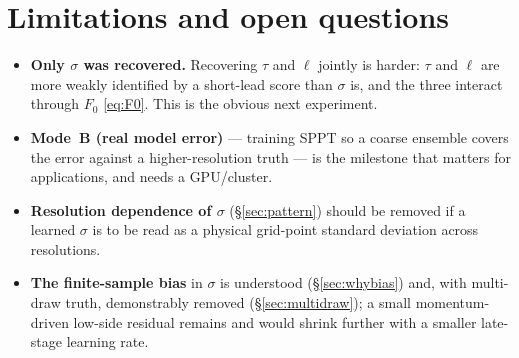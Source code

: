 \documentclass[11pt]{article}
\begin{document}
\section{Limitations and open questions}
\begin{itemize}
\item \textbf{Only $\sigma$ was recovered.} Recovering $\tau$ and $\ell$ jointly
  is harder: $\tau$ and $\ell$ are more weakly identified by a short-lead score
  than $\sigma$ is, and the three interact through $F_0$ \eqref{eq:F0}. This is
  the obvious next experiment.
\item \textbf{Mode~B (real model error)} --- training SPPT so a coarse ensemble
  covers the error against a higher-resolution truth --- is the milestone that
  matters for applications, and needs a GPU/cluster.
\item \textbf{Resolution dependence of $\sigma$} (\S\ref{sec:pattern}) should be
  removed if a learned $\sigma$ is to be read as a physical grid-point standard
  deviation across resolutions.
\item \textbf{The finite-sample bias} in $\sigma$ is understood
  (\S\ref{sec:whybias}) and, with multi-draw truth, demonstrably removed
  (\S\ref{sec:multidraw}); a small momentum-driven low-side residual remains and
  would shrink further with a smaller late-stage learning rate.
\end{itemize}

\end{document}
